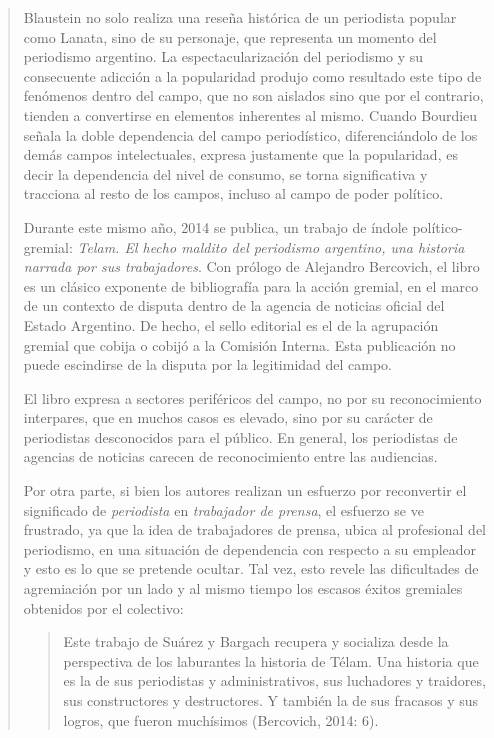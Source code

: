 \begin{quote}
Blaustein no solo realiza una reseña histórica de un periodista popular como Lanata, sino de su personaje, que representa un momento del periodismo argentino. La espectacularización del periodismo y su consecuente adicción a la popularidad produjo como resultado este tipo de fenómenos dentro del campo, que no son aislados sino que por el contrario, tienden a convertirse en elementos inherentes al mismo. Cuando Bourdieu señala la doble dependencia del campo periodístico, diferenciándolo de los demás campos intelectuales, expresa justamente que la popularidad, es decir la dependencia del nivel de consumo, se torna significativa y tracciona al resto de los campos, incluso al campo de poder político.

Durante este mismo año, 2014 se publica, un trabajo de índole político-gremial: \emph{Telam. El hecho maldito del periodismo argentino, una historia narrada por sus trabajadores}. Con prólogo de Alejandro Bercovich, el libro es un clásico exponente de bibliografía para la acción gremial, en el marco de un contexto de disputa dentro de la agencia de noticias oficial del Estado Argentino. De hecho, el sello editorial es el de la agrupación gremial que cobija o cobijó a la Comisión Interna. Esta publicación no puede escindirse de la disputa por la legitimidad del campo.

El libro expresa a sectores periféricos del campo, no por su reconocimiento interpares, que en muchos casos es elevado, sino por su carácter de periodistas desconocidos para el público. En general, los periodistas de agencias de noticias carecen de reconocimiento entre las audiencias.

Por otra parte, si bien los autores realizan un esfuerzo por reconvertir el significado de \emph{periodista} en \emph{trabajador de prensa}, el esfuerzo se ve frustrado, ya que la idea de trabajadores de prensa, ubica al profesional del periodismo, en una situación de dependencia con respecto a su empleador y esto es lo que se pretende ocultar. Tal vez, esto revele las dificultades de agremiación por un lado y al mismo tiempo los escasos éxitos gremiales obtenidos por el colectivo:

\begin{quote}
	Este trabajo de Suárez y Bargach recupera y socializa desde la perspectiva de los laburantes la historia de Télam. Una historia que es la de sus periodistas y administrativos, sus luchadores y traidores, sus constructores y destructores. Y también la de sus fracasos y sus logros, que fueron muchísimos (Bercovich, 2014: 6).
\end{quote}



\end{quote}
